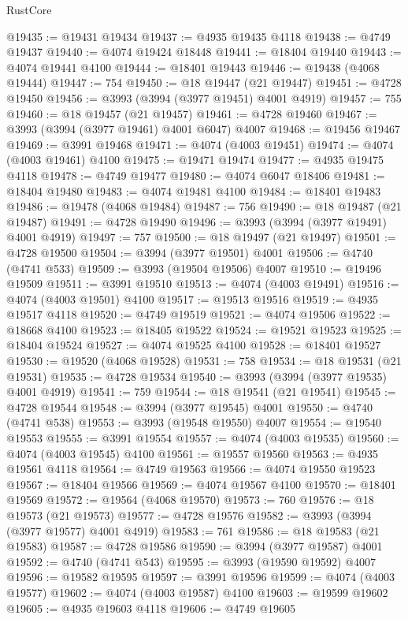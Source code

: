 \begin{lexlean}{RustCore}
\begin{coremodule}
@19435 := @19431 @19434
@19437 := @4935 @19435 @4118
@19438 := @4749 @19437
@19440 := @4074 @19424 @18448
@19441 := @18404 @19440
@19443 := @4074 @19441 @4100
@19444 := @18401 @19443
@19446 := @19438 (@4068 @19444)
@19447 := 754
@19450 := @18 @19447 (@21 @19447)
@19451 := @4728 @19450
@19456 := @3993 (@3994 (@3977 @19451) @4001 @4919)
@19457 := 755
@19460 := @18 @19457 (@21 @19457)
@19461 := @4728 @19460
@19467 := @3993 (@3994 (@3977 @19461) @4001 @6047) @4007
@19468 := @19456 @19467
@19469 := @3991 @19468
@19471 := @4074 (@4003 @19451)
@19474 := @4074 (@4003 @19461) @4100
@19475 := @19471 @19474
@19477 := @4935 @19475 @4118
@19478 := @4749 @19477
@19480 := @4074 @6047 @18406
@19481 := @18404 @19480
@19483 := @4074 @19481 @4100
@19484 := @18401 @19483
@19486 := @19478 (@4068 @19484)
@19487 := 756
@19490 := @18 @19487 (@21 @19487)
@19491 := @4728 @19490
@19496 := @3993 (@3994 (@3977 @19491) @4001 @4919)
@19497 := 757
@19500 := @18 @19497 (@21 @19497)
@19501 := @4728 @19500
@19504 := @3994 (@3977 @19501) @4001
@19506 := @4740 (@4741 @533)
@19509 := @3993 (@19504 @19506) @4007
@19510 := @19496 @19509
@19511 := @3991 @19510
@19513 := @4074 (@4003 @19491)
@19516 := @4074 (@4003 @19501) @4100
@19517 := @19513 @19516
@19519 := @4935 @19517 @4118
@19520 := @4749 @19519
@19521 := @4074 @19506
@19522 := @18668 @4100
@19523 := @18405 @19522
@19524 := @19521 @19523
@19525 := @18404 @19524
@19527 := @4074 @19525 @4100
@19528 := @18401 @19527
@19530 := @19520 (@4068 @19528)
@19531 := 758
@19534 := @18 @19531 (@21 @19531)
@19535 := @4728 @19534
@19540 := @3993 (@3994 (@3977 @19535) @4001 @4919)
@19541 := 759
@19544 := @18 @19541 (@21 @19541)
@19545 := @4728 @19544
@19548 := @3994 (@3977 @19545) @4001
@19550 := @4740 (@4741 @538)
@19553 := @3993 (@19548 @19550) @4007
@19554 := @19540 @19553
@19555 := @3991 @19554
@19557 := @4074 (@4003 @19535)
@19560 := @4074 (@4003 @19545) @4100
@19561 := @19557 @19560
@19563 := @4935 @19561 @4118
@19564 := @4749 @19563
@19566 := @4074 @19550 @19523
@19567 := @18404 @19566
@19569 := @4074 @19567 @4100
@19570 := @18401 @19569
@19572 := @19564 (@4068 @19570)
@19573 := 760
@19576 := @18 @19573 (@21 @19573)
@19577 := @4728 @19576
@19582 := @3993 (@3994 (@3977 @19577) @4001 @4919)
@19583 := 761
@19586 := @18 @19583 (@21 @19583)
@19587 := @4728 @19586
@19590 := @3994 (@3977 @19587) @4001
@19592 := @4740 (@4741 @543)
@19595 := @3993 (@19590 @19592) @4007
@19596 := @19582 @19595
@19597 := @3991 @19596
@19599 := @4074 (@4003 @19577)
@19602 := @4074 (@4003 @19587) @4100
@19603 := @19599 @19602
@19605 := @4935 @19603 @4118
@19606 := @4749 @19605

\end{coremodule}
\end{lexlean}
